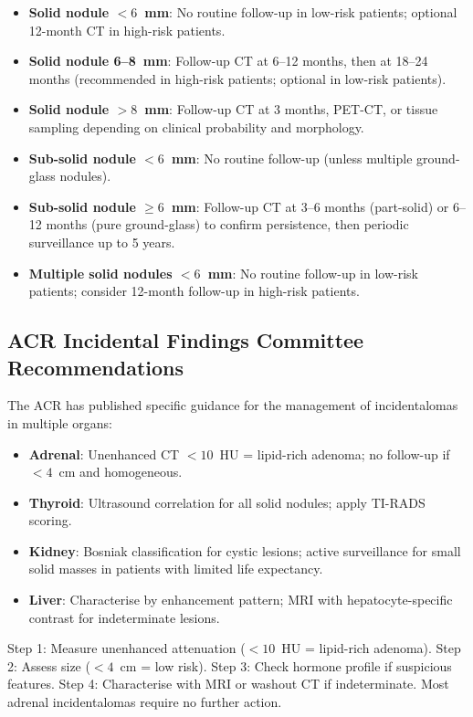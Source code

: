 \begin{itemize}
    \item \textbf{Solid nodule $<6$~mm}: No routine follow-up in low-risk patients; optional 12-month CT in high-risk patients.
    \item \textbf{Solid nodule 6--8~mm}: Follow-up CT at 6--12 months, then at 18--24 months (recommended in high-risk patients; optional in low-risk patients).
    \item \textbf{Solid nodule $>8$~mm}: Follow-up CT at 3 months, PET-CT, or tissue sampling depending on clinical probability and morphology.
    \item \textbf{Sub-solid nodule $<6$~mm}: No routine follow-up (unless multiple ground-glass nodules).
    \item \textbf{Sub-solid nodule $\geq6$~mm}: Follow-up CT at 3--6 months (part-solid) or 6--12 months (pure ground-glass) to confirm persistence, then periodic surveillance up to 5 years.
    \item \textbf{Multiple solid nodules $<6$~mm}: No routine follow-up in low-risk patients; consider 12-month follow-up in high-risk patients.
\end{itemize}

\subsection{ACR Incidental Findings Committee Recommendations}
The ACR has published specific guidance for the management of incidentalomas in multiple organs:
\begin{itemize}
    \item \textbf{Adrenal}: Unenhanced CT $<10$~HU = lipid-rich adenoma; no follow-up if $<4$~cm and homogeneous.
    \item \textbf{Thyroid}: Ultrasound correlation for all solid nodules; apply TI-RADS scoring.
    \item \textbf{Kidney}: Bosniak classification for cystic lesions; active surveillance for small solid masses in patients with limited life expectancy.
    \item \textbf{Liver}: Characterise by enhancement pattern; MRI with hepatocyte-specific contrast for indeterminate lesions.
\end{itemize}

\begin{pearlbox}
Step 1: Measure unenhanced attenuation ($<10$~HU = lipid-rich adenoma). Step 2: Assess size ($<4$~cm = low risk). Step 3: Check hormone profile if suspicious features. Step 4: Characterise with MRI or washout CT if indeterminate. Most adrenal incidentalomas require no further action.
\end{pearlbox}

